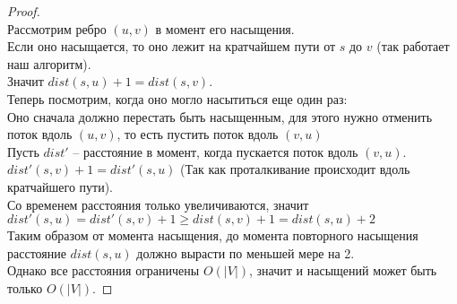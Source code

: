 \begin{proof}\ \\
	Рассмотрим ребро $(u, v)$ в момент его насыщения. \\
	Если оно насыщается, то оно лежит на кратчайшем пути от $s$ до  $v$ (так работает наш алгоритм).\\
	Значит  $dist(s, u) + 1 = dist(s, v).$ \\

	Теперь посмотрим, когда оно могло насытиться еще один раз: \\
	Оно сначала должно перестать быть насыщенным, для этого нужно отменить поток вдоль $(u, v)$, то есть пустить поток вдоль  $(v, u)$ \\
	Пусть  $dist'$ -- расстояние в момент, когда пускается поток вдоль  $(v, u)$. \\
	$dist'(s, v) + 1 = dist'(s, u)$ (Так как проталкивание происходит вдоль кратчайшего пути). \\
	Со временем расстояния только увеличиваются, значит $dist'(s, u) = dist'(s, v) + 1 \geq dist(s, v) + 1 = dist(s, u) + 2$ \\
	Таким образом от момента насыщения, до момента повторного насыщения расстояние  $dist(s, u)$ должно вырасти по меньшей мере на 2. \\
	Однако все расстояния ограничены $O(\lvert V \rvert)$, значит и насыщений может быть только $O(\lvert V \rvert)$.
\end{proof}
